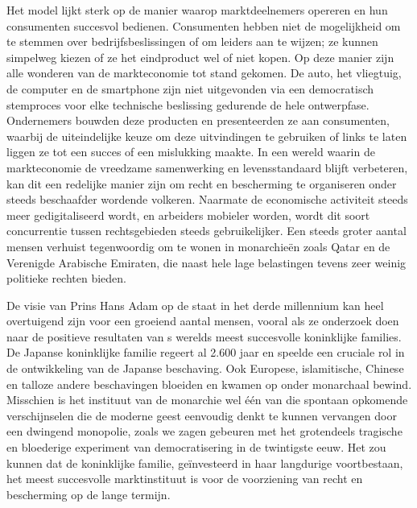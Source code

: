 Het model lijkt sterk op de manier waarop marktdeelnemers opereren en hun consumenten succesvol bedienen. Consumenten hebben niet de mogelijkheid om te stemmen over bedrijfsbeslissingen of om leiders aan te wijzen; ze kunnen simpelweg kiezen of ze het eindproduct wel of niet kopen. Op deze manier zijn alle wonderen van de markteconomie tot stand gekomen. De auto, het vliegtuig, de computer en de smartphone zijn niet uitgevonden via een democratisch stemproces voor elke technische beslissing gedurende de hele ontwerpfase. Ondernemers bouwden deze producten en presenteerden ze aan consumenten, waarbij de uiteindelijke keuze om deze uitvindingen te gebruiken of links te laten liggen ze tot een succes of een mislukking maakte. In een wereld waarin de markteconomie de vreedzame samenwerking en levensstandaard blijft verbeteren, kan dit een redelijke manier zijn om recht en bescherming te organiseren onder steeds beschaafder wordende volkeren. Naarmate de economische activiteit steeds meer gedigitaliseerd wordt, en arbeiders mobieler worden, wordt dit soort concurrentie tussen rechtsgebieden steeds gebruikelijker. Een steeds groter aantal mensen verhuist tegenwoordig om te wonen in monarchieën zoals Qatar en de Verenigde Arabische Emiraten, die naast hele lage belastingen tevens zeer weinig politieke rechten bieden.

De visie van Prins Hans Adam op de staat in het derde millennium kan heel overtuigend zijn voor een groeiend aantal mensen, vooral als ze onderzoek doen naar de positieve resultaten van \textquotesingle s werelds meest succesvolle koninklijke families. De Japanse koninklijke familie regeert al 2.600 jaar en speelde een cruciale rol in de ontwikkeling van de Japanse beschaving. Ook Europese, islamitische, Chinese en talloze andere beschavingen bloeiden en kwamen op onder monarchaal bewind. Misschien is het instituut van de monarchie wel één van die spontaan opkomende verschijnselen die de moderne geest eenvoudig denkt te kunnen vervangen door een dwingend monopolie, zoals we zagen gebeuren met het grotendeels tragische en bloederige experiment van democratisering in de twintigste eeuw. Het zou kunnen dat de koninklijke familie, geïnvesteerd in haar langdurige voortbestaan, het meest succesvolle marktinstituut is voor de voorziening van recht en bescherming op de lange termijn.

